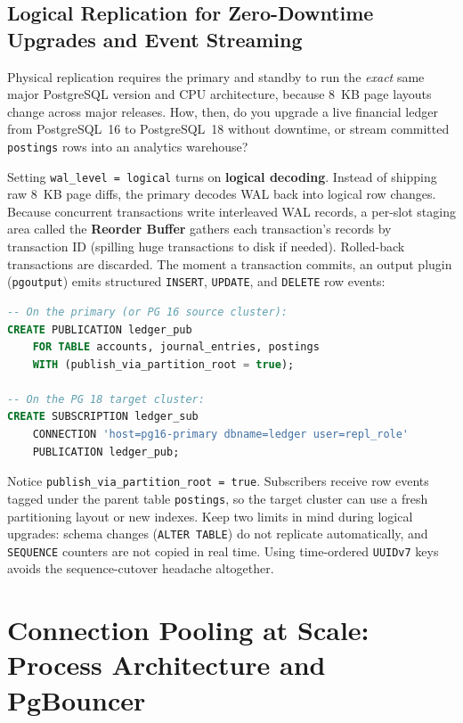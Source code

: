 \subsection{Logical Replication for Zero-Downtime Upgrades and Event Streaming}
\label{ch08:logical-replication}

Physical replication requires the primary and standby to run the \emph{exact} same
major PostgreSQL version and CPU architecture, because 8~KB page layouts change
across major releases. How, then, do you upgrade a live financial ledger from
PostgreSQL~16 to PostgreSQL~18 without downtime, or stream committed
\texttt{postings} rows into an analytics warehouse?

Setting \texttt{wal\_level = logical} turns on \textbf{logical decoding}. Instead
of shipping raw 8~KB page diffs, the primary decodes WAL back into logical row
changes. Because concurrent transactions write interleaved WAL records, a per-slot
staging area called the \textbf{Reorder Buffer} gathers each transaction's records
by transaction ID (spilling huge transactions to disk if needed). Rolled-back
transactions are discarded. The moment a transaction commits, an output plugin
(\texttt{pgoutput}) emits structured \texttt{INSERT}, \texttt{UPDATE}, and
\texttt{DELETE} row events:

\begin{lstlisting}[language=SQL]
-- On the primary (or PG 16 source cluster):
CREATE PUBLICATION ledger_pub
    FOR TABLE accounts, journal_entries, postings
    WITH (publish_via_partition_root = true);

-- On the PG 18 target cluster:
CREATE SUBSCRIPTION ledger_sub
    CONNECTION 'host=pg16-primary dbname=ledger user=repl_role'
    PUBLICATION ledger_pub;
\end{lstlisting}

Notice \texttt{publish\_via\_partition\_root = true}. Subscribers receive row
events tagged under the parent table \texttt{postings}, so the target cluster can
use a fresh partitioning layout or new indexes. Keep two limits in mind during
logical upgrades: schema changes (\texttt{ALTER TABLE}) do not replicate
automatically, and \texttt{SEQUENCE} counters are not copied in real time. Using
time-ordered \texttt{UUIDv7} keys avoids the sequence-cutover headache altogether.

\section{Connection Pooling at Scale: Process Architecture and PgBouncer}
\label{ch08:pooling}

